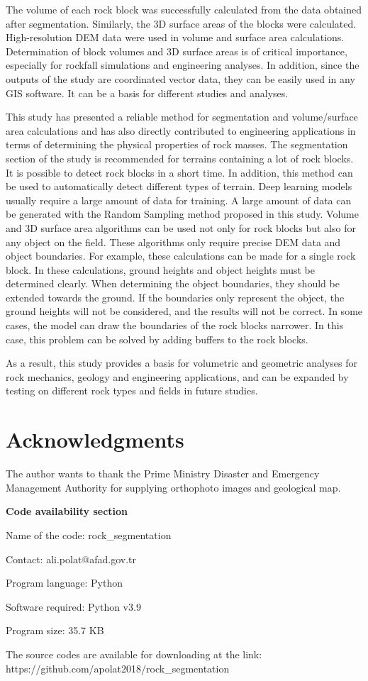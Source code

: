 \documentclass[a4paper,fleqn]{cas-sc}
\begin{document}
The volume of each rock block was successfully calculated from the data obtained after segmentation. Similarly, the 3D surface areas of the blocks were calculated. High-resolution DEM data were used in volume and surface area calculations. Determination of block volumes and 3D surface areas is of critical importance, especially for rockfall simulations and engineering analyses. In addition, since the outputs of the study are coordinated vector data, they can be easily used in any GIS software. It can be a basis for different studies and analyses.

This study has presented a reliable method for segmentation and volume/surface area calculations and has also directly contributed to engineering applications in terms of determining the physical properties of rock masses. The segmentation section of the study is recommended for terrains containing a lot of rock blocks. It is possible to detect rock blocks in a short time. In addition, this method can be used to automatically detect different types of terrain. Deep learning models usually require a large amount of data for training. A large amount of data can be generated with the Random Sampling method proposed in this study. Volume and 3D surface area algorithms can be used not only for rock blocks but also for any object on the field. These algorithms only require precise DEM data and object boundaries. For example, these calculations can be made for a single rock block. In these calculations, ground heights and object heights must be determined clearly. When determining the object boundaries, they should be extended towards the ground. If the boundaries only represent the object, the ground heights will not be considered, and the results will not be correct. In some cases, the model can draw the boundaries of the rock blocks narrower. In this case, this problem can be solved by adding buffers to the rock blocks.

As a result, this study provides a basis for volumetric and geometric analyses for rock mechanics, geology and engineering applications, and can be expanded by testing on different rock types and fields in future studies.


\section{Acknowledgments}

The author wants to thank the Prime Ministry Disaster and Emergency Management Authority for supplying orthophoto images and geological map.

\newpage

\textbf{Code availability section}

Name of the code: rock\_segmentation

Contact: ali.polat@afad.gov.tr

Program language: Python
 
Software required: Python v3.9

Program size: 35.7 KB

The source codes are available for downloading at the link:
https://github.com/apolat2018/rock\_segmentation



 
\end{document}
